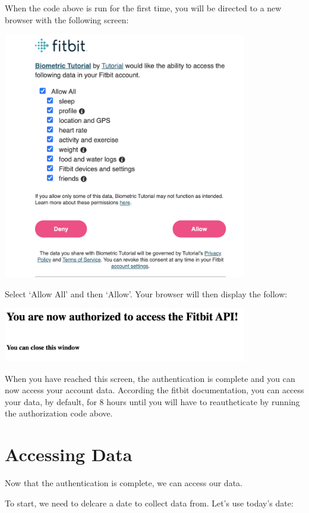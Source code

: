\documentclass[]{book}
\newenvironment{Shaded}{\begin{snugshade}}{\end{snugshade}}
\newcommand{\SpecialCharTok}[1]{\textcolor[rgb]{0.00,0.00,0.00}{#1}}
\newcommand{\StringTok}[1]{\textcolor[rgb]{0.31,0.60,0.02}{#1}}
\newcommand{\CommentTok}[1]{\textcolor[rgb]{0.56,0.35,0.01}{\textit{#1}}}
\newcommand{\OperatorTok}[1]{\textcolor[rgb]{0.81,0.36,0.00}{\textbf{#1}}}
\newcommand{\BuiltInTok}[1]{#1}
\newcommand{\NormalTok}[1]{#1}
\begin{document}
When the code above is run for the first time, you will be directed to a
new browser with the following screen:

\includegraphics[width=0.80000\textwidth]{images/accessData.png}

Select `Allow All' and then `Allow'. Your browser will then display the
follow:

\includegraphics[width=0.80000\textwidth]{images/done.png}

When you have reached this screen, the authentication is complete and
you can now access your account data. According the fitbit
documentation, you can access your data, by default, for 8 hours until
you will have to reautheticate by running the authorization code above.

\section{Accessing Data}\label{accessing-data}

Now that the authentication is complete, we can access our data.

To start, we need to delcare a date to collect data from. Let's use
today's date:

\begin{Shaded}
\end{Shaded}
\end{document}
